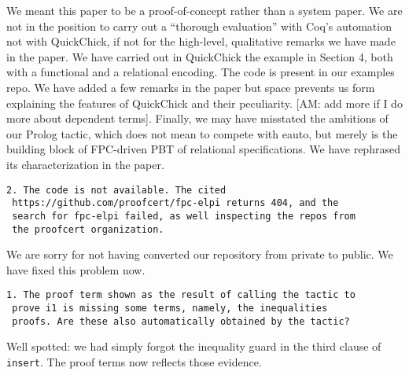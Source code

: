 \documentclass{article}
\begin{document}
We meant this paper to be a proof-of-concept rather than a system
paper. We are not in the position to carry out a ``thorough
evaluation'' with Coq's automation not with QuickChick, if not for the
high-level, qualitative remarks we have made in the paper.  We have
carried out in QuickChick the example in Section 4, both with a
functional and a relational encoding. The code is present in our
examples repo. We have added a few remarks in the paper but space
prevents us form explaining the features of QuickChick and their
peculiarity. [AM: add more if I do more about dependent
terms]. Finally, we may have misstated the ambitions of our Prolog
tactic, which does not mean to compete with eauto, but merely is the
building block of FPC-driven PBT of relational specifications. We have rephrased its characterization in the paper.


\begin{verbatim}
2. The code is not available. The cited
 https://github.com/proofcert/fpc-elpi returns 404, and the
 search for fpc-elpi failed, as well inspecting the repos from
 the proofcert organization.
\end{verbatim}

We are sorry for not having converted our repository from private
to public.  We have fixed this problem now.

\begin{verbatim}
1. The proof term shown as the result of calling the tactic to
 prove i1 is missing some terms, namely, the inequalities
 proofs. Are these also automatically obtained by the tactic?
\end{verbatim}

Well spotted: we had simply forgot the inequality guard in the third clause of
\texttt{insert}. The proof terms now reflects those evidence.
\end{document}
